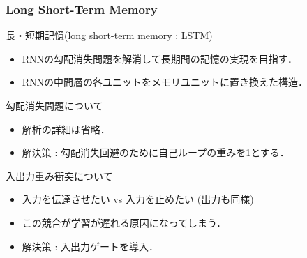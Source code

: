 \documentclass[dvipdfmx]{beamer}
\begin{document}
\begin{frame}
    \frametitle{Long Short-Term Memory}
    長・短期記憶(long short-term memory : LSTM)
    \begin{itemize}
        \item RNNの勾配消失問題を解消して長期間の記憶の実現を目指す．
        \item RNNの中間層の各ユニットをメモリユニットに置き換えた構造．
    \end{itemize}

    \vspace{\baselineskip}

    勾配消失問題について
    \begin{itemize}
        \item 解析の詳細は省略．
        \item 解決策 : 勾配消失回避のために自己ループの重みを1とする．
    \end{itemize}

    入出力重み衝突について
    \begin{itemize}
        \item 入力を伝達させたい vs 入力を止めたい (出力も同様)
        \item この競合が学習が遅れる原因になってしまう．
        \item 解決策 : 入出力ゲートを導入．
    \end{itemize}
\end{frame}
\end{document}
